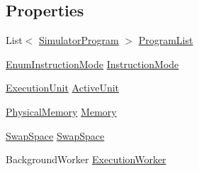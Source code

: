\subsection*{Properties}
\begin{DoxyCompactItemize}
\item 
List$<$ \hyperlink{class_c_p_u___o_s___simulator_1_1_c_p_u_1_1_simulator_program}{Simulator\+Program} $>$ \hyperlink{class_c_p_u___o_s___simulator_1_1_main_window_a632c91cdd16a7498bbb8dfb3e5df252c}{Program\+List}
\item 
\hyperlink{namespace_c_p_u___o_s___simulator_adc17a5a5e004084f05dc8e4d3f70e31f}{Enum\+Instruction\+Mode} \hyperlink{class_c_p_u___o_s___simulator_1_1_main_window_a65916937137002c26f9eb1c88cfff519}{Instruction\+Mode}
\item 
\hyperlink{class_c_p_u___o_s___simulator_1_1_c_p_u_1_1_execution_unit}{Execution\+Unit} \hyperlink{class_c_p_u___o_s___simulator_1_1_main_window_a3d03550a73d7ab18ebd143a38dbf1431}{Active\+Unit}
\item 
\hyperlink{class_c_p_u___o_s___simulator_1_1_memory_1_1_physical_memory}{Physical\+Memory} \hyperlink{class_c_p_u___o_s___simulator_1_1_main_window_abee63f1a7c5feecf97e7253a65806a5a}{Memory}
\item 
\hyperlink{class_c_p_u___o_s___simulator_1_1_memory_1_1_swap_space}{Swap\+Space} \hyperlink{class_c_p_u___o_s___simulator_1_1_main_window_a114d0bf1ca63b0d9213537758535aecf}{Swap\+Space}
\item 
Background\+Worker \hyperlink{class_c_p_u___o_s___simulator_1_1_main_window_aab5d6c95426ebe1e75b7c3bfc0488b84}{Execution\+Worker}
\end{DoxyCompactItemize}
